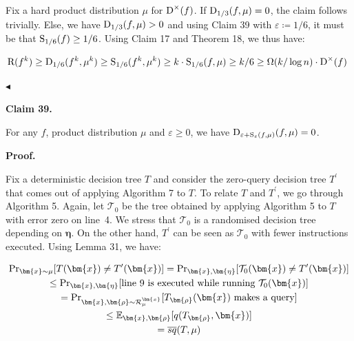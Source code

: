 \documentclass[10pt,a4paper]{article}
\begin{document}
Fix a hard product distribution $\mu$ for ${\textup{D}}^{\times}(f)$. If ${\textup{D}}_{1/3}(f,\mu)=0$, the claim follows trivially. Else, we have ${\textup{D}}_{1/3}(f,\mu)>0$ and using Claim 39 with $\varepsilon\coloneqq 1/6$, it must be that ${\textup{S}}_{1/6}(f)\geq 1/6$. Using Claim 17 and Theorem 18, we thus have:\par


\[\begin{gathered}
{\textup{R}}(f^{k})\geq{\textup{D}}_{1/6}(f^{k},\mu^{k})\geq{\textup{S}}_{1/6}(f^{k},\mu^{k})\geq k\cdot{\textup{S}}_{1/6}(f,\mu)\geq k/6\geq\Omega(k/\log n)\cdot{\textup{D}}^{\times}(f)\
\end{gathered}\]


$\blacktriangleleft$\par





\par\medskip\noindent\textbf{
Claim 39. 
}\par



For any $f$, product distribution $\mu$ and $\varepsilon\geq 0$, we have ${\textup{D}}_{\varepsilon+{\textup{S}}_{\varepsilon}(f,\mu)}(f,\mu)=0$.\par







\par\medskip\noindent\textbf{
\textbf{Proof}.}\par




Fix a deterministic decision tree $T$ and consider the zero-query decision tree $T^{\prime}$ that comes out of applying Algorithm 7 to $T$. To relate $T$ and $T^{\prime}$, we go through Algorithm 5. Again, let $\mathcal{T}_{0}$ be the tree obtained by applying Algorithm 5 to $T$ with error zero on line 4. We stress that $\mathcal{T}_{0}$ is a randomised decision tree depending on $\bm{\eta}$. On the other hand, $T^{\prime}$ can be seen as $\mathcal{T}_{0}$ with fewer instructions executed. Using Lemma 31, we have:\par


\[\begin{gathered}
\displaystyle\Pr\nolimits_{\bm{x}\sim\mu}[T(\bm{x})\neq T^{\prime}(\bm{x})] \displaystyle=\Pr\nolimits_{\bm{x},\bm{\eta}}[\mathcal{T}_{0}(\bm{x})\neq T^{\prime}(\bm{x})] \\
\displaystyle\leq\Pr\nolimits_{\bm{x},\bm{\eta}}[\text{line\nobreak\ 9 is executed while running $\mathcal{T}_{0}(\bm{x})$}] \\
\displaystyle=\Pr\nolimits_{\bm{x},\bm{\rho}\sim\mathcal{R}^{\bm{x}}_{\mu}}[\text{$T_{\bm{\rho}}(\bm{x})$ makes a query}] \\
\displaystyle\leq\mathbb{E}_{\bm{x},\bm{\rho}}[q(T_{\bm{\rho}},\bm{x})] \\
\displaystyle=\mathop{\overline{sq}}(T,\mu)
\end{gathered}\]
\end{document}
